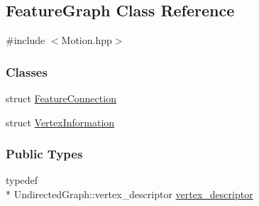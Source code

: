 \hypertarget{classFeatureGraph}{\subsection{Feature\-Graph Class Reference}
\label{classFeatureGraph}
}


{\ttfamily \#include $<$Motion.\-hpp$>$}

\subsubsection*{Classes}
\begin{DoxyCompactItemize}
\item 
struct \hyperlink{structFeatureGraph_1_1FeatureConnection}{Feature\-Connection}
\item 
struct \hyperlink{structFeatureGraph_1_1VertexInformation}{Vertex\-Information}
\end{DoxyCompactItemize}
\subsubsection*{Public Types}
\begin{DoxyCompactItemize}
\item 
typedef \\*
Undirected\-Graph\-::vertex\-\_\-descriptor \hyperlink{classFeatureGraph_ab85a700fea1a3a494db459c0f8277844}{vertex\-\_\-descriptor}
\end{DoxyCompactItemize}

